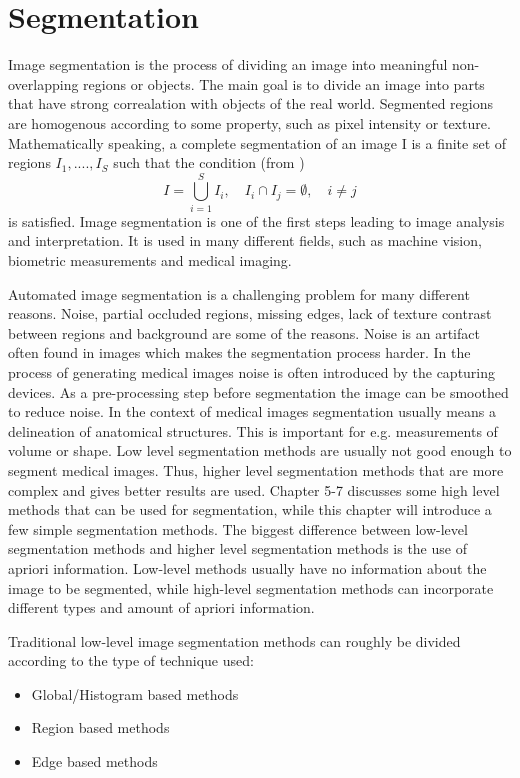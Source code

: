 \chapter{Segmentation}
Image segmentation is the process of dividing an image into meaningful non-overlapping regions or objects. The main goal is to divide an image into parts that have strong correalation with objects of the real world. Segmented regions are homogenous according to some property, such as pixel intensity or texture. Mathematically speaking, a complete segmentation of an image I is a finite set of regions \(I_1,...., I_S\) such that the condition (from \cite{drung00})
\begin{equation}
I = \bigcup_{i=1}^S I_{i} , \quad I_{i} \cap I_{j} = \emptyset , \quad i \neq j
\label{segCond}
\end{equation}
is satisfied. Image segmentation is one of the first steps leading to image analysis and interpretation. It is used in many different fields, such as machine vision, biometric measurements and medical imaging.

Automated image segmentation is a challenging problem for many different reasons. Noise, partial occluded regions, missing edges, lack of texture contrast between regions and background are some of the reasons. Noise is an artifact often found in images which makes the segmentation process harder. In the process of generating medical images noise is often introduced by the capturing devices. As a pre-processing step before segmentation the image can be smoothed to reduce noise. In the context of medical images segmentation usually means a delineation of anatomical structures. This is important for e.g. measurements of volume or shape. Low level segmentation methods are usually not good enough to segment medical images. Thus, higher level segmentation methods that are more complex and gives better results are used. Chapter 5-7 discusses some high level methods that can be used for segmentation, while this chapter will introduce a few simple segmentation methods. The biggest difference between low-level segmentation methods and higher level segmentation methods is the use of apriori information. Low-level methods usually have no information about the image to be segmented, while high-level segmentation methods can incorporate different types and amount of apriori information.

Traditional low-level image segmentation methods can roughly be divided according to the type of technique used:
\begin{itemize}
  \item Global/Histogram based methods
  \item Region based methods
  \item Edge based methods
\end{itemize}

